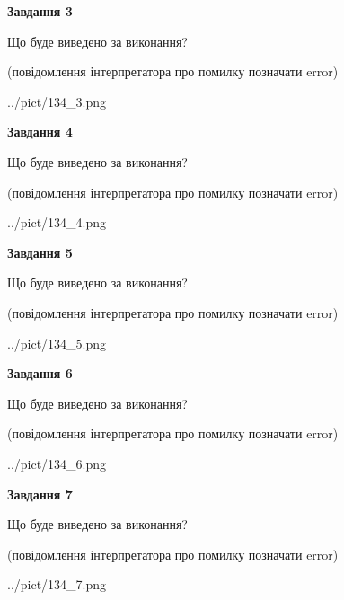 \documentclass[12pt, ukrainian]{article}
\begin{document}
{\begin {large}
{\begin {center}\textbf{Завдання 3}\end {center}}\par
Що буде виведено за виконання?\par
 (повідомлення інтерпретатора про помилку позначати error)\par
\begin{center}
	{../pict/134_3.png}
\end{center}
\newpage

{\begin {center}\textbf{Завдання 4}\end {center}}\par
Що буде виведено за виконання?\par
 (повідомлення інтерпретатора про помилку позначати error)\par
\begin{center}
	{../pict/134_4.png}
\end{center}
\newpage

{\begin {center}\textbf{Завдання 5}\end {center}}\par
Що буде виведено за виконання?\par
 (повідомлення інтерпретатора про помилку позначати error)\par
\begin{center}
	{../pict/134_5.png}
\end{center}
\newpage

{\begin {center}\textbf{Завдання 6}\end {center}}\par
Що буде виведено за виконання?\par
 (повідомлення інтерпретатора про помилку позначати error)\par
\begin{center}
	{../pict/134_6.png}
\end{center}
\newpage

{\begin {center}\textbf{Завдання 7}\end {center}}\par
Що буде виведено за виконання?\par
 (повідомлення інтерпретатора про помилку позначати error)\par
\begin{center}
	{../pict/134_7.png}
\end{center}
\newpage


\end{large}}
\end{document}
